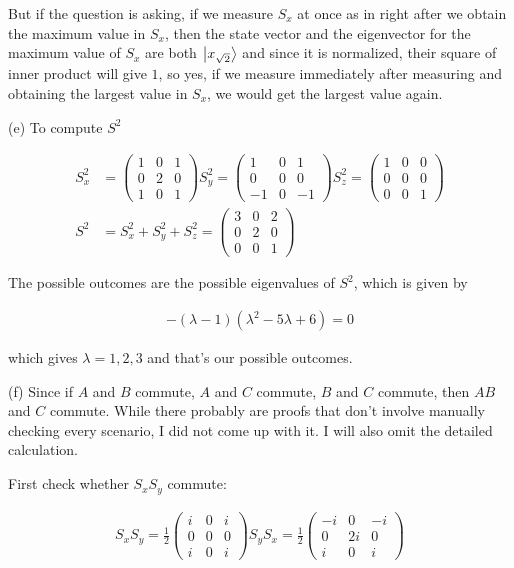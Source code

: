 \documentclass{article}
\begin{document}
But if the question is asking, if we measure $S_x$ at once as in right after we obtain the maximum value in $S_x$, then the state vector and the eigenvector for the maximum value of $S_x$ are both $\ket{x_{\sqrt{2}}}$ and since it is normalized, their square of inner product will give $1$, so yes, if we measure immediately after measuring and obtaining the largest value in $S_x$, we would get the largest value again.

(e) To compute $S^2$

\begin{align}
    S^2_x &= \begin{pmatrix}
        1 & 0 & 1 \\ 0 & 2 & 0 \\ 1 & 0 & 1
    \end{pmatrix}
    S^2_y = \begin{pmatrix}
        1 & 0 & 1 \\ 0 & 0 & 0 \\ -1 & 0 & -1
    \end{pmatrix}
    S^2_z = \begin{pmatrix}
        1 & 0 & 0 \\ 0 & 0 & 0 \\ 0 & 0 & 1
    \end{pmatrix} \\
    S^2 &= S^2_x + S^2_y + S^2_z = \begin{pmatrix}
        3 & 0 & 2 \\ 0 & 2 & 0 \\ 0 & 0 & 1
    \end{pmatrix}
\end{align}

The possible outcomes are the possible eigenvalues of $S^2$, which is given by

\begin{align}
    -(\lambda-1)(\lambda^2-5\lambda+6) = 0
\end{align}

which gives $\lambda = 1, 2, 3$ and that's our possible outcomes.

(f) Since if $A$ and $B$ commute, $A$ and $C$ commute, $B$ and $C$ commute, then $AB$ and $C$ commute. While there probably are proofs that don't involve manually checking every scenario, I did not come up with it. I will also omit the detailed calculation. 

First check whether $S_x S_y$ commute:

\begin{align}
    S_x S_y = \frac{1}{2}\begin{pmatrix}
        i & 0 & i \\ 0 & 0 & 0 \\ i & 0 & i
    \end{pmatrix}
    S_y S_x = \frac{1}{2} \begin{pmatrix}
        -i & 0 & -i \\ 0 & 2i & 0 \\ i & 0 & i
    \end{pmatrix}
\end{align}
\end{document}
